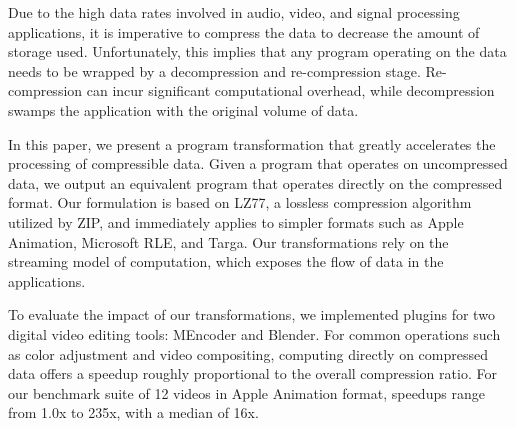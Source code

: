 Due to the high data rates involved in audio, video, and signal
processing applications, it is imperative to compress the data to
decrease the amount of storage used.  Unfortunately, this implies that
any program operating on the data needs to be wrapped by a
decompression and re-compression stage.  Re-compression can incur
significant computational overhead, while decompression swamps the
application with the original volume of data.

In this paper, we present a program transformation that greatly
accelerates the processing of compressible data.  Given a program that
operates on uncompressed data, we output an equivalent program that
operates directly on the compressed format.  Our formulation is based
on LZ77, a lossless compression algorithm utilized by ZIP, and
immediately applies to simpler formats such as Apple Animation,
Microsoft RLE, and Targa.  Our transformations rely on the streaming
model of computation, which exposes the flow of data in the
applications.

To evaluate the impact of our transformations, we implemented plugins
for two digital video editing tools: MEncoder and Blender.  For common
operations such as color adjustment and video compositing, computing
directly on compressed data offers a speedup roughly proportional to
the overall compression ratio.  For our benchmark suite of 12 videos
in Apple Animation format, speedups range from 1.0x to 235x, with a
median of 16x.
